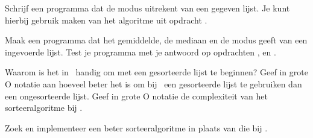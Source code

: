 \opdracht[4] \label{mode2}%
Schrijf een programma dat de modus uitrekent van een gegeven lijst. Je kunt hierbij gebruik maken van het algoritme uit opdracht .

\opdracht[3]
\? Maak een programma dat het gemiddelde, de mediaan en de modus geeft van een ingevoerde lijst.
\? Test je programma met je antwoord op opdrachten ,  en .

\opdracht[5]
\? Waarom is het in \ handig om met een gesorteerde lijst te beginnen?
\? Geef in grote O notatie aan hoeveel beter het is om bij \ een gesorteerde lijst te gebruiken dan een ongesorteerde lijst.
\? Geef in grote O notatie de complexiteit van het sorteeralgoritme bij .

\opdracht[6]
 Zoek en implementeer een beter sorteeralgoritme in plaats van die bij .